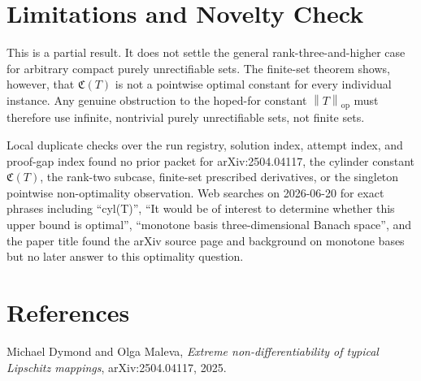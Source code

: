 \documentclass[11pt]{article}
\newcommand{\cyl}{\mathfrak C}
\newcommand{\opnorm}[1]{\left\|#1\right\|_{\mathrm{op}}}
\begin{document}
\section*{Limitations and Novelty Check}

This is a partial result.  It does not settle the general rank-three-and-higher
case for arbitrary compact purely unrectifiable sets.  The finite-set theorem
shows, however, that \(\cyl(T)\) is not a pointwise optimal constant for every
individual instance.  Any genuine obstruction to the hoped-for constant
\(\opnorm{T}\) must therefore use infinite, nontrivial purely unrectifiable
sets, not finite sets.

Local duplicate checks over the run registry, solution index, attempt index,
and proof-gap index found no prior packet for arXiv:2504.04117, the cylinder
constant \(\cyl(T)\), the rank-two subcase, finite-set prescribed derivatives,
or the singleton pointwise non-optimality observation.  Web searches on
2026-06-20 for exact phrases
including ``cyl(T)'', ``It would be of interest to determine whether this upper
bound is optimal'', ``monotone basis three-dimensional Banach space'', and the
paper title found the arXiv source page and background on monotone bases but no
later answer to this optimality question.

\section*{References}

Michael Dymond and Olga Maleva, \emph{Extreme non-differentiability of typical
Lipschitz mappings}, arXiv:2504.04117, 2025.
\end{document}
